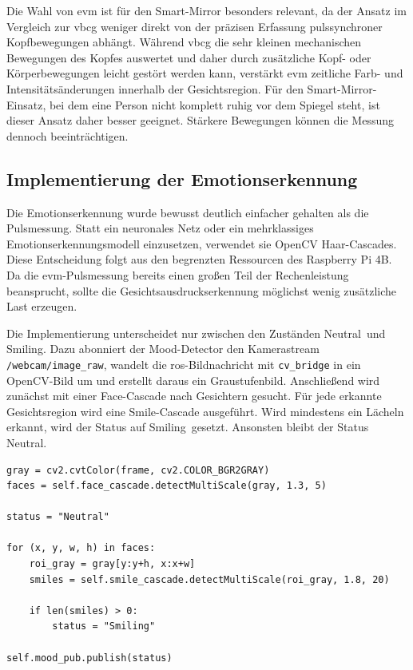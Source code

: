 Die Wahl von \ac{evm} ist für den Smart-Mirror besonders relevant, da der Ansatz im Vergleich zur \ac{vbcg} weniger direkt von der präzisen Erfassung pulssynchroner Kopfbewegungen abhängt. Während \ac{vbcg} die sehr kleinen mechanischen Bewegungen des Kopfes auswertet und daher durch zusätzliche Kopf- oder Körperbewegungen leicht gestört werden kann, verstärkt \ac{evm} zeitliche Farb- und Intensitätsänderungen innerhalb der Gesichtsregion. Für den Smart-Mirror-Einsatz, bei dem eine Person nicht komplett ruhig vor dem Spiegel steht, ist dieser Ansatz daher besser geeignet. Stärkere Bewegungen können die Messung dennoch beeinträchtigen.

\subsection{Implementierung der Emotionserkennung}

Die Emotionserkennung wurde bewusst deutlich einfacher gehalten als die Pulsmessung. Statt ein neuronales Netz oder ein mehrklassiges Emotionserkennungsmodell einzusetzen, verwendet sie OpenCV Haar-Cascades. Diese Entscheidung folgt aus den begrenzten Ressourcen des Raspberry Pi 4B. Da die \ac{evm}-Pulsmessung bereits einen großen Teil der Rechenleistung beansprucht, sollte die Gesichtsausdruckserkennung möglichst wenig zusätzliche Last erzeugen.

Die Implementierung unterscheidet nur zwischen den Zuständen \glqq Neutral\grqq\ und \glqq Smiling\grqq. Dazu abonniert der Mood-Detector den Kamerastream \texttt{/webcam/image\_raw}, wandelt die \ac{ros}-Bildnachricht mit \texttt{cv\_bridge} in ein OpenCV-Bild um und erstellt daraus ein Graustufenbild. Anschließend wird zunächst mit einer Face-Cascade nach Gesichtern gesucht. Für jede erkannte Gesichtsregion wird eine Smile-Cascade ausgeführt. Wird mindestens ein Lächeln erkannt, wird der Status auf \glqq Smiling\grqq\ gesetzt. Ansonsten bleibt der Status \glqq Neutral\grqq.

\begin{lstlisting}[style=algoBericht,caption={Kernlogik der Emotionserkennung mit Haar-Cascades}]
gray = cv2.cvtColor(frame, cv2.COLOR_BGR2GRAY)
faces = self.face_cascade.detectMultiScale(gray, 1.3, 5)

status = "Neutral"

for (x, y, w, h) in faces:
    roi_gray = gray[y:y+h, x:x+w]
    smiles = self.smile_cascade.detectMultiScale(roi_gray, 1.8, 20)

    if len(smiles) > 0:
        status = "Smiling"

self.mood_pub.publish(status)
\end{lstlisting}

